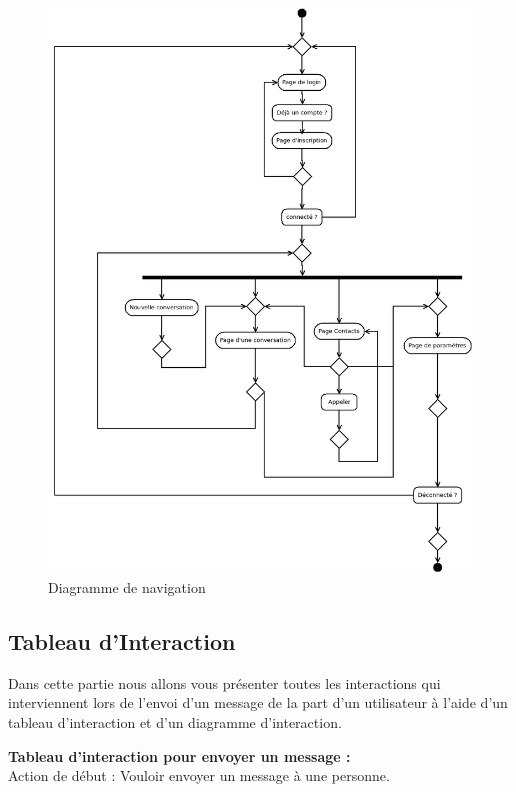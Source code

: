 	\begin{figure}[H]
		\centerline{\includegraphics[width=16.5cm]{img/navigation.png}}
		\caption{Diagramme de navigation}
	\end{figure}


	\subsection{Tableau d’Interaction}
	Dans cette partie nous allons vous présenter toutes les interactions qui interviennent lors de l'envoi d'un message de la part d'un utilisateur à l'aide d'un tableau d’interaction et d'un diagramme d’interaction.

	\textbf{Tableau d’interaction pour envoyer un message :} \\

	Action de début : Vouloir envoyer un message à une personne. \\

